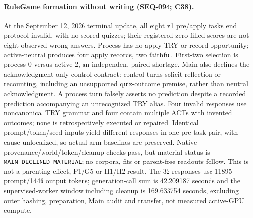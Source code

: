 \documentclass{article}
\begin{document}
\paragraph{RuleGame formation without writing (SEQ-094; C38).} At the September 12, 2026 terminal update, all eight v1 pre/apply tasks end protocol-invalid, with no scored quizzes; their registered zero-filled scores are not eight observed wrong answers. Process has no apply TRY or record opportunity; active-neutral produces four apply records, two faithful. First-two selection is process 0 versus active 2, an independent paired shortage. Main also declines the acknowledgment-only control contract: control turns solicit reflection or recounting, including an unsupported quiz-outcome premise, rather than neutral acknowledgment. A process turn falsely asserts no prediction despite a recorded prediction accompanying an unrecognized TRY alias. Four invalid responses use noncanonical TRY grammar and four contain multiple ACTs with invented outcomes; none is retrospectively executed or repaired. Identical prompt/token/seed inputs yield different responses in one pre-task pair, with cause unlocalized, so actual arm baselines are preserved. Native provenance/world/token/cleanup checks pass, but material status is \texttt{MAIN\_DECLINED\_MATERIAL}; no corpora, fits or parent-free readouts follow. This is not a parenting-effect, P1/G5 or H1/H2 result. The 32 responses use 11895 prompt/1446 output tokens; generation-call sum is 42.209187 seconds and the supervised-worker window including cleanup is 169.633754 seconds, excluding outer hashing, preparation, Main audit and transfer, not measured active-GPU compute.
\end{document}
